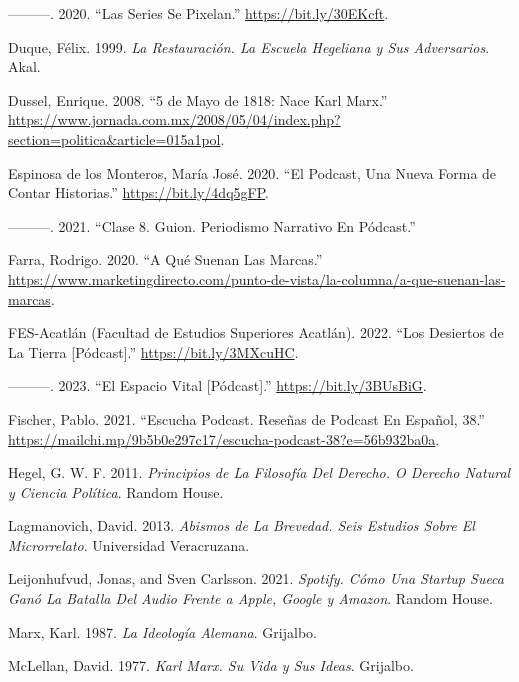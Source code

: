 \documentclass[
]{interact}
\newlength{\cslhangindent}
\newenvironment{CSLReferences}[2] %
 {\begin{list}{}{%
  \setlength{\itemindent}{0pt}
  \setlength{\leftmargin}{0pt}
  \setlength{\parsep}{0pt}
  \ifodd #1
   \setlength{\leftmargin}{\cslhangindent}
   \setlength{\itemindent}{-1\cslhangindent}
  \fi
  \setlength{\itemsep}{#2\baselineskip}}}
 {\end{list}}
\begin{document}
\begin{CSLReferences}{1}{0}
---------. 2020. {``Las Series Se Pixelan.''}
\url{https://bit.ly/30EKcft}.

Duque, Félix. 1999. \emph{La Restauración. La Escuela Hegeliana y Sus
Adversarios}. Akal.

Dussel, Enrique. 2008. {``5 de Mayo de 1818: Nace Karl Marx.''}
\url{https://www.jornada.com.mx/2008/05/04/index.php?section=politica&article=015a1pol}.

Espinosa de los Monteros, María José. 2020. {``El Podcast, Una Nueva
Forma de Contar Historias.''} \url{https://bit.ly/4dq5gFP}.

---------. 2021. {``Clase 8. Guion. Periodismo Narrativo En Pódcast.''}

Farra, Rodrigo. 2020. {``A Qué Suenan Las Marcas.''}
\url{https://www.marketingdirecto.com/punto-de-vista/la-columna/a-que-suenan-las-marcas}.

FES-Acatlán (Facultad de Estudios Superiores Acatlán). 2022. {``Los
Desiertos de La Tierra {[}Pódcast{]}.''} \url{https://bit.ly/3MXcuHC}.

---------. 2023. {``El Espacio Vital {[}Pódcast{]}.''}
\url{https://bit.ly/3BUsBiG}.

Fischer, Pablo. 2021. {``Escucha Podcast. Reseñas de Podcast En Español,
38.''}
\url{https://mailchi.mp/9b5b0e297c17/escucha-podcast-38?e=56b932ba0a}.

Hegel, G. W. F. 2011. \emph{Principios de La Filosofía Del Derecho. O
Derecho Natural y Ciencia Política}. Random House.

Lagmanovich, David. 2013. \emph{Abismos de La Brevedad. Seis Estudios
Sobre El Microrrelato}. Universidad Veracruzana.

Leijonhufvud, Jonas, and Sven Carlsson. 2021. \emph{Spotify. Cómo Una
Startup Sueca Ganó La Batalla Del Audio Frente a Apple, Google y
Amazon}. Random House.

Marx, Karl. 1987. \emph{La Ideología Alemana}. Grijalbo.

McLellan, David. 1977. \emph{Karl Marx. Su Vida y Sus Ideas}. Grijalbo.


\end{CSLReferences}
\end{document}
